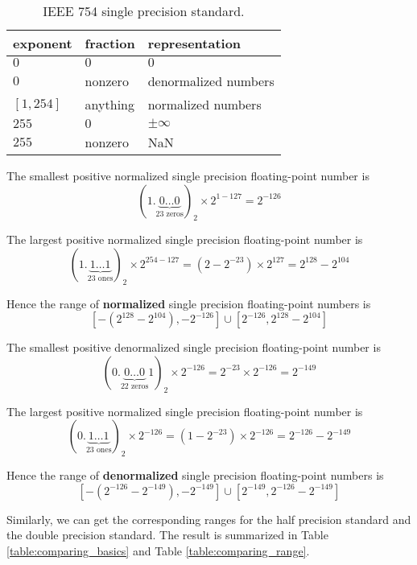 \documentclass[manuscript, screen, nonacm]{acmart}
\begin{document}
\begin{table}
\renewcommand*{\arraystretch}{1.2}
\caption{IEEE 754 single precision standard.}
\begin{tabularx}{1.0\textwidth}{
    | >{\centering\arraybackslash}X
    | >{\centering\arraybackslash}X
    | >{\centering\arraybackslash}X |
}
\hline
exponent & fraction & representation \\
\hline\hline
$0$ & $0$ & $0$ \\
\hline
$0$ & nonzero & denormalized numbers \\
\hline
$[1, 254]$ & anything & normalized numbers \\
\hline
$255$ & $0$ & $\pm \infty$ \\
\hline
$255$ & nonzero & NaN \\
\hline
\end{tabularx}
\end{table}

The smallest positive normalized single precision floating-point number is
$$(1.\underbrace{0 \dots 0}_\text{23 zeros})_2 \times 2^{1-127} = 2^{-126}$$

The largest positive normalized single precision floating-point number is
$$(1.\underbrace{1 \dots 1}_\text{23 ones})_2 \times 2^{254-127} = (2 - 2^{-23}) \times 2^{127} = 2^{128} - 2^{104}$$

Hence the range of \textbf{normalized} single precision floating-point numbers is
$$\left[-\left(2^{128}-2^{104}\right), -2^{-126}\right] \cup \left[2^{-126}, 2^{128}-2^{104}\right]$$

The smallest positive denormalized single precision floating-point number is
$$(0.\underbrace{0 \dots 0}_\text{22 zeros} 1)_2 \times 2^{-126} = 2^{-23} \times 2^{-126} = 2^{-149}$$

The largest positive normalized single precision floating-point number is
$$(0.\underbrace{1 \dots 1}_\text{23 ones})_2 \times 2^{-126} = (1 - 2^{-23}) \times 2^{-126} = 2^{-126} - 2^{-149}$$

Hence the range of \textbf{denormalized} single precision floating-point numbers is
$$\left[-\left(2^{-126}-2^{-149}\right), -2^{-149}\right] \cup \left[2^{-149}, 2^{-126}-2^{-149}\right]$$

Similarly, we can get the corresponding ranges for the half precision standard and the double precision standard.
The result is summarized in Table \ref{table:comparing_basics} and Table \ref{table:comparing_range}.
\end{document}
